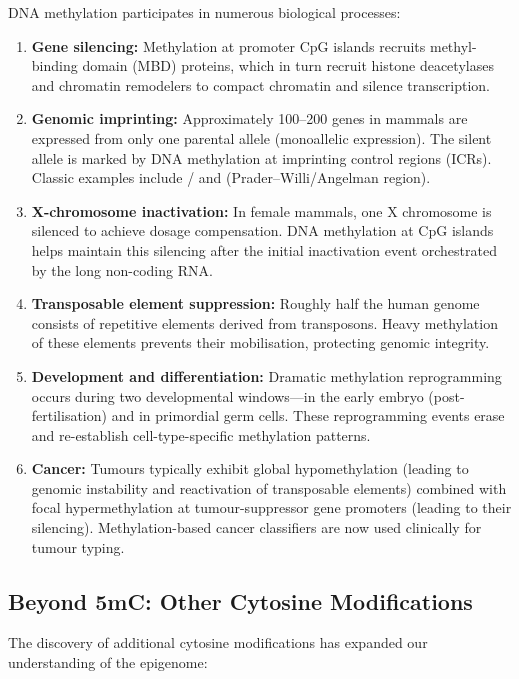 DNA methylation participates in numerous biological processes:

\begin{enumerate}[itemsep=3pt]
  \item \textbf{Gene silencing:} Methylation at promoter CpG islands recruits methyl-binding domain (MBD) proteins, which in turn recruit histone deacetylases and chromatin remodelers to compact chromatin and silence transcription.
  \item \textbf{Genomic imprinting:} Approximately 100--200 genes in mammals are expressed from only one parental allele (monoallelic expression). The silent allele is marked by DNA methylation at imprinting control regions (ICRs). Classic examples include / and  (Prader--Willi/Angelman region).
  \item \textbf{X-chromosome inactivation:} In female mammals, one X chromosome is silenced to achieve dosage compensation. DNA methylation at CpG islands helps maintain this silencing after the initial inactivation event orchestrated by the  long non-coding RNA.
  \item \textbf{Transposable element suppression:} Roughly half the human genome consists of repetitive elements derived from transposons. Heavy methylation of these elements prevents their mobilisation, protecting genomic integrity.
  \item \textbf{Development and differentiation:} Dramatic methylation reprogramming occurs during two developmental windows---in the early embryo (post-fertilisation) and in primordial germ cells. These reprogramming events erase and re-establish cell-type-specific methylation patterns.
  \item \textbf{Cancer:} Tumours typically exhibit global hypomethylation (leading to genomic instability and reactivation of transposable elements) combined with focal hypermethylation at tumour-suppressor gene promoters (leading to their silencing). Methylation-based cancer classifiers are now used clinically for tumour typing.
\end{enumerate}

\subsection{Beyond 5mC: Other Cytosine Modifications}
\label{subsec:methylation:other-mods}

The discovery of additional cytosine modifications has expanded our understanding of the epigenome:

